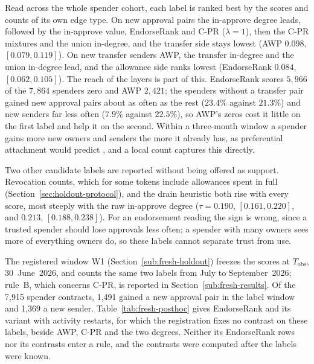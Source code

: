 

Read across the whole spender cohort, each label is ranked best by the scores and counts of its own edge type. On new approval pairs the in-approve degree leads, followed by the in-approve value, EndorseRank and \mbox{C-PR} ($\lambda=1$), then the \mbox{C-PR} mixtures and the union in-degree, and the transfer side stays lowest (AWP $0.098$, $[0.079,0.119]$). On new transfer senders AWP, the transfer in-degree and the union in-degree lead, and the allowance side ranks lowest (EndorseRank $0.084$, $[0.062,0.105]$). The reach of the layers is part of this. EndorseRank scores $5{,}966$ of the $7{,}864$ spenders zero and AWP $2{,}421$; the spenders without a transfer pair gained new approval pairs about as often as the rest ($23.4\%$ against $21.3\%$) and new senders far less often ($7.9\%$ against $22.5\%$), so AWP's zeros cost it little on the first label and help it on the second. Within a three-month window a spender gains more new owners and senders the more it already has, as preferential attachment would predict \parencite{barabasi1999scaling}, and a local count captures this directly.

Two other candidate labels are reported without being offered as support. Revocation counts, which for some tokens include allowances spent in full (Section~\ref{sec:holdout-protocol}), and the drain heuristic both rise with every score, most steeply with the raw in-approve degree ($\tau=0.190$, $[0.161,0.220]$, and $0.213$, $[0.188,0.238]$). For an endorsement reading the sign is wrong, since a trusted spender should lose approvals less often; a spender with many owners sees more of everything owners do, so these labels cannot separate trust from use.


The registered window W1 (Section~\ref{sub:fresh-holdout}) freezes the scores at $T_{\mathrm{obs}}$, 30~June~2026, and counts the same two labels from July to September~2026; rule~B, which concerns \mbox{C-PR}, is reported in Section~\ref{sub:fresh-results}. Of the 7,915 spender contracts, 1,491 gained a new approval pair in the label window and 1,369 a new sender. Table~\ref{tab:fresh-posthoc} gives EndorseRank and its variant with activity restarts, for which the registration fixes no contrast on these labels, beside AWP, \mbox{C-PR} and the two degrees. Neither its EndorseRank rows nor its contrasts enter a rule, and the contrasts were computed after the labels were known.

